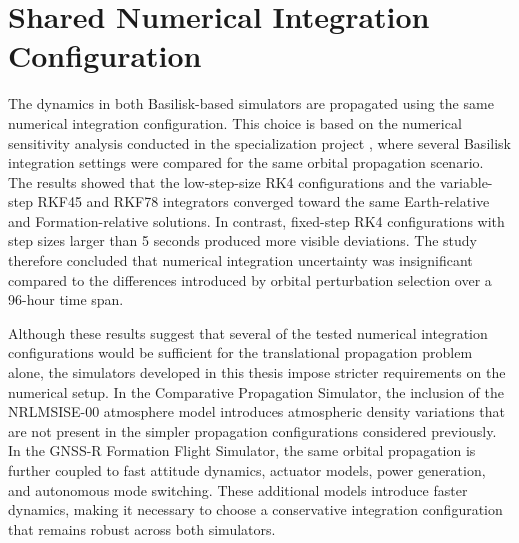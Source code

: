\section{Shared Numerical Integration Configuration}
\label{sec:numerical_integration_method}

The dynamics in both Basilisk-based simulators are propagated using the same numerical integration configuration. This choice is based on the numerical sensitivity analysis conducted in the specialization project \cite{hystad2025}, where several Basilisk integration settings were compared for the same orbital propagation scenario. The results showed that the low-step-size RK4 configurations and the variable-step RKF45 and RKF78 integrators converged toward the same Earth-relative and Formation-relative solutions. In contrast, fixed-step RK4 configurations with step sizes larger than 5 seconds produced more visible deviations. The study therefore concluded that numerical integration uncertainty was insignificant compared to the differences introduced by orbital perturbation selection over a 96-hour time span.

Although these results suggest that several of the tested numerical integration configurations would be sufficient for the translational propagation problem alone, the simulators developed in this thesis impose stricter requirements on the numerical setup. In the Comparative Propagation Simulator, the inclusion of the NRLMSISE-00 atmosphere model introduces atmospheric density variations that are not present in the simpler propagation configurations considered previously. In the GNSS-R Formation Flight Simulator, the same orbital propagation is further coupled to fast attitude dynamics, actuator models, power generation, and autonomous mode switching. These additional models introduce faster dynamics, making it necessary to choose a conservative integration configuration that remains robust across both simulators.

